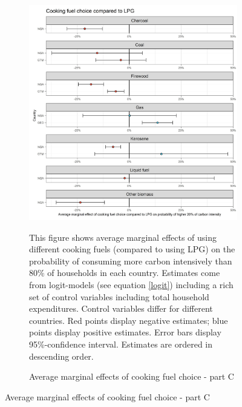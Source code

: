  \begin{figure}[ht!]\ContinuedFloat
   \centering
   \begin{subfigure}[b]{\textwidth}
   \centering
   \caption{Average marginal effects of cooking fuel choice - part C} \label{fig:Logit_ME_CF_3}
   \includegraphics{1_Figures/Analysis_Logit_Models_Marginal_Effects/Average_Marginal_Effects_affected_upper_80_CF_LPG_2017.jpg}
   \begin{subcaption2}
     This figure shows average marginal effects of using different cooking fuels (compared to using LPG) on the probability of consuming more carbon intensively than 80\% of households in each country. Estimates come from logit-models (see equation \ref{logit}) including a rich set of control variables including total household expenditures. Control variables differ for different countries. Red points display negative estimates; blue points display positive estimates. Error bars display 95\%-confidence interval. Estimates are ordered in descending order.
   \end{subcaption2}
   \end{subfigure}
 \end{figure}
 \clearpage

